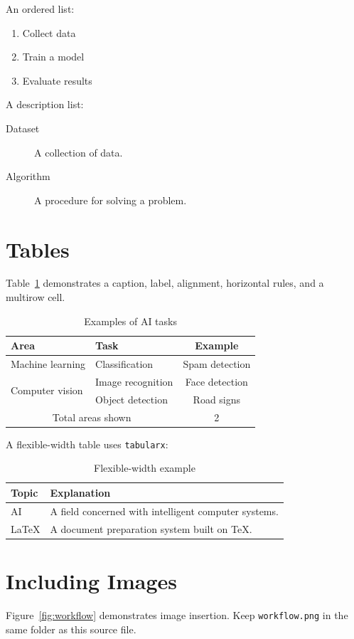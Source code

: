 \documentclass[12pt,a4paper]{article}
\begin{document}
An ordered list:
\begin{enumerate}[label=\alph*)]
  \item Collect data
  \item Train a model
  \item Evaluate results
\end{enumerate}

A description list:
\begin{description}
  \item[Dataset] A collection of data.
  \item[Algorithm] A procedure for solving a problem.
\end{description}

\section{Tables}\label{sec:tables}
Table~\ref{tab:methods} demonstrates a caption, label, alignment,
horizontal rules, and a multirow cell.

\begin{table}[htbp]
\centering
\caption{Examples of AI tasks}\label{tab:methods}
\begin{tabular}{|l|l|c|}
\hline
\textbf{Area} & \textbf{Task} & \textbf{Example}\\
\hline
Machine learning & Classification & Spam detection\\
\hline
\multirow{2}{*}{Computer vision} & Image recognition & Face detection\\
\cline{2-3}
& Object detection & Road signs\\
\hline
\multicolumn{2}{|c|}{Total areas shown} & 2\\
\hline
\end{tabular}
\end{table}

A flexible-width table uses \texttt{tabularx}:
\begin{table}[htbp]
\centering
\caption{Flexible-width example}
\begin{tabularx}{0.9\linewidth}{|l|X|}
\hline
Topic & Explanation\\ \hline
AI & A field concerned with intelligent computer systems.\\ \hline
LaTeX & A document preparation system built on TeX.\\ \hline
\end{tabularx}
\end{table}

\section{Including Images}\label{sec:figures}
Figure~\ref{fig:workflow} demonstrates image insertion. Keep
\texttt{workflow.png} in the same folder as this source file.
\end{document}
